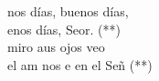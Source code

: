 \begin{cancion}%
	nos días, buenos días, \\
	enos días, Seor. (**)\\
	 miro aus ojos veo\\
	 el am nos e en el Señ (**)\\
\end{cancion}%
